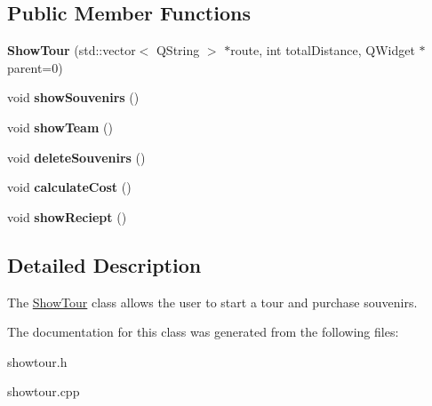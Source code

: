 \subsection*{Public Member Functions}
\begin{DoxyCompactItemize}
\item 
\mbox{\label{class_show_tour_a6c9590dd98ca0edd65faef7bc4a209ef}} 
{\bfseries Show\+Tour} (std\+::vector$<$ Q\+String $>$ $\ast$route, int total\+Distance, Q\+Widget $\ast$parent=0)
\item 
\mbox{\label{class_show_tour_aecb0217838a57e284d9a807e2e80f921}} 
void {\bfseries show\+Souvenirs} ()
\item 
\mbox{\label{class_show_tour_a9887b15275c0468c0655265c2582fe46}} 
void {\bfseries show\+Team} ()
\item 
\mbox{\label{class_show_tour_a2b053259b897159792bb6fd39059e23c}} 
void {\bfseries delete\+Souvenirs} ()
\item 
\mbox{\label{class_show_tour_ae42b7dcb12eb72ba434e126c1b17876e}} 
void {\bfseries calculate\+Cost} ()
\item 
\mbox{\label{class_show_tour_aeb8662e97c27d7bae6c0b2ce5f73506d}} 
void {\bfseries show\+Reciept} ()
\end{DoxyCompactItemize}


\subsection{Detailed Description}
The \hyperlink{class_show_tour}{Show\+Tour} class allows the user to start a tour and purchase souvenirs. 

The documentation for this class was generated from the following files\+:\begin{DoxyCompactItemize}
\item 
showtour.\+h\item 
showtour.\+cpp\end{DoxyCompactItemize}
